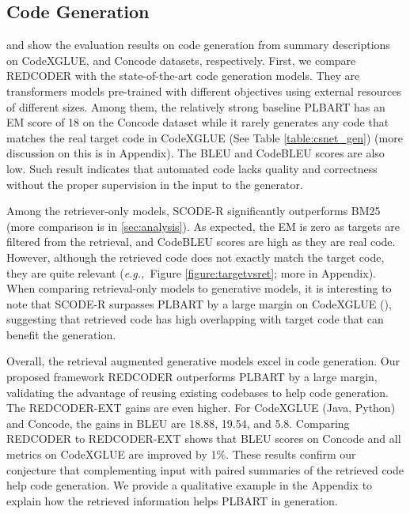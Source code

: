 \documentclass[11pt]{article}
\newcommand{\tool}{{REDCODER}\xspace}
\newcommand{\toolext}{{REDCODER-EXT}\xspace}
\newcommand{\coder}{SCODE-R\xspace}
\newcommand{\eg}{\textit{e.g.,}~}
\begin{document}
    \subsection{Code Generation}
    \label{sec:exp-result-codegen}
    
    \begin{comment}
    1. Compare with retrieval only, and explain why is this improvement?
    2. Compare with generator only and explain why this improvement?
    3. Compare with REDCODER vs REDCODER-ext, and explain why this improvement
    \end{comment} 
     and  show the evaluation results on code generation from summary descriptions on CodeXGLUE, and Concode datasets, respectively. First, we compare \tool with the state-of-the-art code generation models. They are transformers models pre-trained with different objectives using external resources of different sizes. Among them, the relatively strong baseline PLBART has an EM score of 18 on the Concode dataset while it rarely generates any code that matches the real target code in CodeXGLUE (See Table \ref{table:csnet_gen}) (more discussion on this is in Appendix).  The BLEU and CodeBLEU scores are also low. Such result indicates that automated code lacks quality and correctness without the proper supervision in the input to the generator. 
    
    Among the retriever-only models, \coder significantly outperforms BM25 (more comparison is in \cref{sec:analysis}). As expected, the EM is zero as targets are filtered from the retrieval, and CodeBLEU scores are high as they are real code. However, although the retrieved code does not exactly match the target code, they are quite relevant (\eg Figure \ref{figure:targetvsret}; more in Appendix). When comparing retrieval-only models to generative models, it is interesting to note that \coder surpasses PLBART by a large margin on CodeXGLUE (), suggesting that retrieved code has high overlapping with target code that can benefit the generation.
    
    Overall, the retrieval augmented generative models excel in code generation. Our proposed framework \tool outperforms PLBART by a large margin, validating the advantage of reusing existing codebases to help code generation.  The \toolext gains are even higher. For CodeXGLUE (Java, Python) and Concode, the  gains in BLEU are 18.88, 19.54, and 5.8. Comparing \tool to \toolext shows that BLEU scores on Concode and all metrics on CodeXGLUE are improved by 1\%. These results confirm our conjecture that complementing input with paired summaries of the retrieved code help code generation.  We provide a qualitative example in the Appendix to explain how the retrieved information helps PLBART in generation.
    
\end{document}
